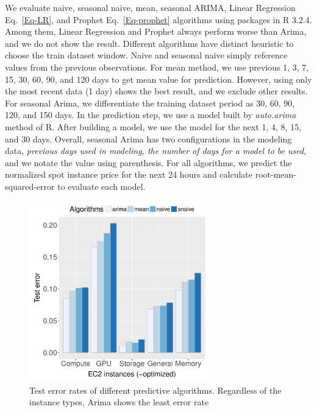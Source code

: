 \documentclass[graybox]{svmult}
\begin{document}
We evaluate naive, seasonal naive, mean, seasonal ARIMA, Linear Regression Eq.~\ref {Eq-LR}, and Prophet Eq.~\ref {Eq-prophet} algorithms using packages in R 3.2.4. Among them, Linear Regression and Prophet always perform worse than Arima, and we do not show the result. Different algorithms have distinct heuristic to choose the train dataset window. Naive and seasonal naive simply reference values from the previous observations. For mean method, we use previous 1, 3, 7, 15, 30, 60, 90, and 120 days to get mean value for prediction. However, using only the most recent data (1 day) shows the best result, and we exclude other results. For seasonal Arima, we differentiate the training dataset period as 30, 60, 90, 120, and 150 days. In the prediction step, we use a model built by \textit{auto.arima} method of R. After building a model, we use the model for the next 1, 4, 8, 15, and 30 days. Overall, seasonal Arima has two configurations in the modeling data, \emph{previous days used in modeling, the number of days for a model to be used}, and we notate the value using parenthesis. For all algorithms, we predict the normalized spot instance price for the next 24 hours and calculate root-mean-squared-error to evaluate each model.   
\begin{figure}
\centering\includegraphics[width=0.7\textwidth]{figures/algorithm-compare-different-instance-type.pdf}\caption{Test error rates of different predictive algorithms. Regardless of the instance types, Arima shows the least error rate\label{fig:algo-diff-inst}}
\end{figure}
\end{document}

